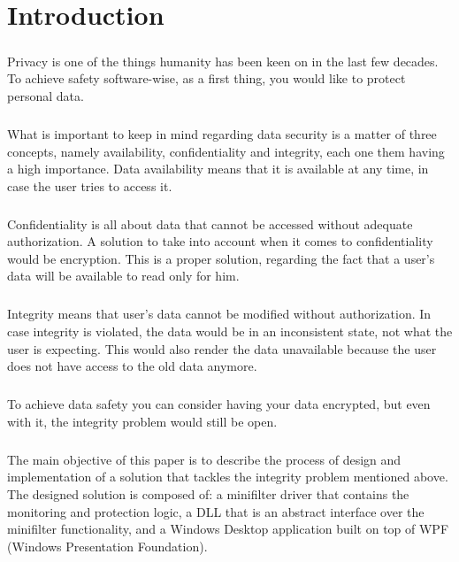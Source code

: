 \chapter{Introduction}
	\paragraph{}
	Privacy is one of the things humanity has been keen on in the last few decades. To achieve safety software-wise, as a first thing, you would like to protect personal data. 
	
	\paragraph{}
	What is important to keep in mind regarding data security is a matter of three concepts, namely availability, confidentiality and integrity, each one them having a high importance. Data availability means that it is available at any time, in case the user tries to access it.
	
	\paragraph{}
	Confidentiality is all about data that cannot be accessed without adequate authorization. A solution to take into account when it comes to confidentiality would be encryption. This is a proper solution, regarding the fact that a user's data will be available to read only for him.
	
	\paragraph{}
	Integrity means that user's data cannot be modified without authorization. In case integrity is violated, the data would be in an inconsistent state, not what the user is expecting. This would also render the data unavailable because the user does not have access to the old data anymore.
	
	\paragraph{}
	To achieve data safety you can consider having your data encrypted, but even with it, the integrity problem would still be open.   
	
	\paragraph{}
	The main objective of this paper is to describe the process of design and implementation of a solution that tackles the integrity problem mentioned above. The designed solution is composed of: a minifilter driver that contains the monitoring and protection logic, a DLL that is an abstract interface over the minifilter functionality, and a Windows Desktop application built on top of WPF (Windows Presentation Foundation). 
	
